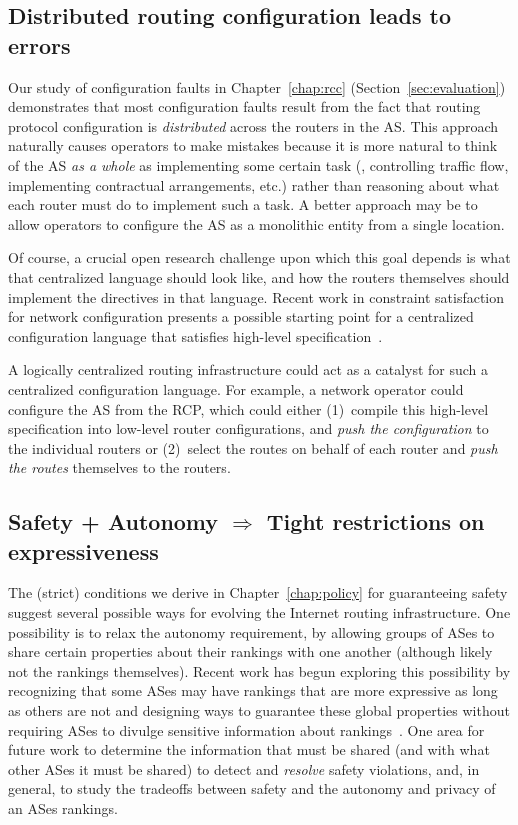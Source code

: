 \subsection{Distributed routing configuration leads to errors}

Our study of configuration faults in Chapter~\ref{chap:rcc}
(Section~\ref{sec:evaluation}) demonstrates
that most configuration faults result from the fact that routing
protocol configuration is {\em distributed} across the routers in the
AS.  This approach naturally causes operators to make mistakes because
it is more natural to think of the AS {\em as a whole} as implementing
some certain task (\eg, controlling traffic flow, implementing
contractual arrangements, etc.) rather than reasoning about what each
router must do to implement such a task.  A better approach may be to
allow operators to configure the AS as a monolithic entity from a
single location.

Of course, a crucial open research challenge upon which this goal
depends is what that centralized language should look like, and how the
routers themselves should implement the directives in that language.
Recent work in constraint satisfaction for network configuration
presents a possible starting point for a centralized configuration
language that satisfies high-level specification~\cite{Narain2004}.

A logically centralized routing infrastructure could act as
a catalyst for such a centralized configuration language.  For example,
a network operator could configure the AS from the RCP, which could
either (1)~compile this high-level specification into low-level router
configurations, and {\em push the configuration} to the individual
routers or (2)~select the routes on behalf of each router and {\em push
the routes} themselves to the routers.

\subsection{Safety + Autonomy $\Rightarrow$ Tight restrictions on
expressiveness} 

The (strict) conditions we derive in Chapter~\ref{chap:policy} for
guaranteeing safety suggest several possible ways for evolving the
Internet routing infrastructure.  One possibility is to relax the
autonomy requirement, by allowing groups of ASes to share certain
properties about their rankings with one another (although likely not the
rankings themselves).  Recent work has begun exploring this possibility
by recognizing that some ASes may have rankings that are more expressive
as long as others are not and designing ways to guarantee these global
properties without requiring ASes to divulge sensitive information about
rankings~\cite{Machiraju2004}.  One area for future work to determine
the information that must be shared (and with what other ASes it must be
shared) to detect and {\em resolve} safety violations, and, in
general, to study the tradeoffs between safety and the autonomy and
privacy of an ASes rankings.

